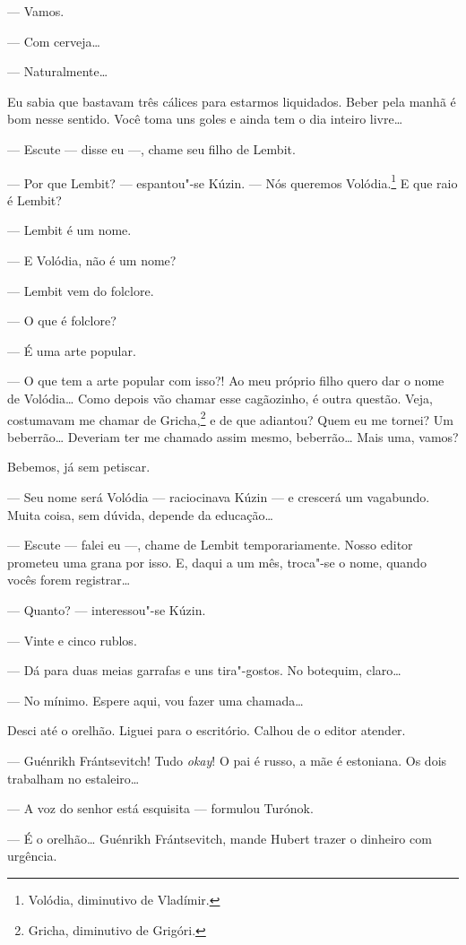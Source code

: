--- Vamos.

--- Com cerveja\ldots{}

--- Naturalmente\ldots{}

Eu sabia que bastavam três cálices para estarmos liquidados. Beber pela
manhã é bom nesse sentido. Você toma uns goles e ainda tem o dia inteiro
livre\ldots{}

--- Escute --- disse eu ---, chame seu filho de Lembit.

--- Por que Lembit? --- espantou"-se Kúzin. --- Nós queremos Volódia.\footnote{Volódia, diminutivo de Vladímir.} E que raio é Lembit?

--- Lembit é um nome.

--- E Volódia, não é um nome?

--- Lembit vem do folclore.

--- O que é folclore?

--- É uma arte popular.

--- O que tem a arte popular com isso?! Ao meu próprio filho quero dar o
nome de Volódia\ldots{} Como depois vão chamar esse cagãozinho, é outra
questão. Veja, costumavam me chamar de Gricha,\footnote{Gricha,
  diminutivo de Grigóri.} e de que adiantou? Quem eu me tornei? Um
beberrão\ldots{} Deveriam ter me chamado assim mesmo, beberrão\ldots{} Mais uma,
vamos?

Bebemos, já sem petiscar.

--- Seu nome será Volódia ---
raciocinava Kúzin --- e crescerá um vagabundo. Muita coisa, sem dúvida,
depende da educação\ldots{}

--- Escute --- falei eu ---, chame de Lembit temporariamente. Nosso
editor prometeu uma grana por isso. E, daqui a um mês, troca"-se o nome,
quando vocês forem registrar\ldots{}

--- Quanto? --- interessou"-se Kúzin.

--- Vinte e cinco rublos.

--- Dá para duas meias garrafas e uns tira"-gostos. No botequim, claro\ldots{}

--- No mínimo. Espere aqui, vou fazer uma chamada\ldots{}

Desci até o orelhão. Liguei para o escritório. Calhou de o editor
atender.

--- Guénrikh Frántsevitch! Tudo \emph{okay}! O pai é russo, a mãe é
estoniana. Os dois trabalham no estaleiro\ldots{}

--- A voz do senhor está esquisita --- formulou Turónok.

--- É o orelhão\ldots{} Guénrikh Frántsevitch, mande Hubert trazer o dinheiro
com urgência.

